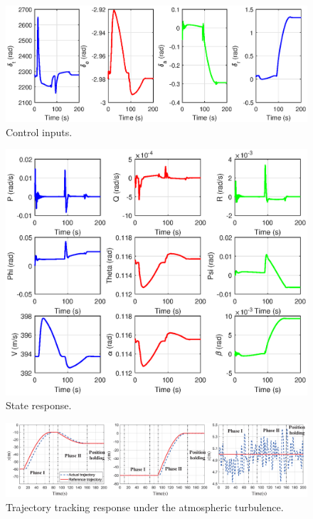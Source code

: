 \begin{figure}[tph]
	\begin{center}
		\includegraphics[scale=0.7]{Figures/Figs_Ch7/Fig_ActuatorInputs.eps}
	\end{center}
	\caption{Control inputs.}
	\label{Fig_Input}
\end{figure}
\begin{figure}[tph]
	\begin{center}
		\includegraphics[scale=0.7]{Figures/Figs_Ch7/Fig_State9.eps}
	\end{center}
	\caption{State response.}
	\label{Fig_State}
\end{figure}
\begin{figure}[tph]
	\begin{center}
		\includegraphics[scale=0.28]{Figures/Figs_Ch7/Fig_TrackingResponse1.eps}
	\end{center}
	\caption{Trajectory tracking response under the atmospheric turbulence.}
	\label{Fig_TrackingResponse1}
\end{figure}

